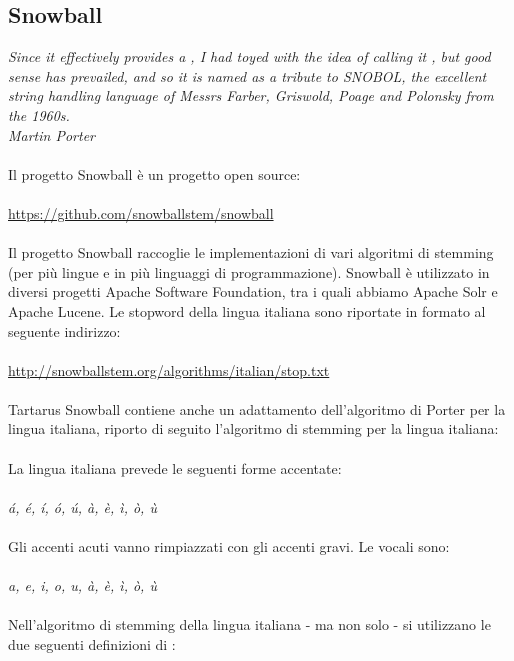 \documentclass{article}
\theoremstyle{plain}
\theoremstyle{definition}
\begin{document}
\subsection{Snowball}
\textit{
Since it effectively provides a , I had toyed with the idea of calling it , but good sense has prevailed, and so it is  named as a tribute to SNOBOL, the excellent string handling language of Messrs Farber, Griswold, Poage and Polonsky from the 1960s.
\\
Martin Porter
}
\\
\\
Il progetto Snowball è un progetto open source:
\\
\\
\url{https://github.com/snowballstem/snowball}
\\
\\
Il progetto Snowball raccoglie le implementazioni di vari algoritmi di stemming (per più lingue e in più linguaggi di programmazione). Snowball è utilizzato in diversi progetti Apache Software Foundation, tra i quali abbiamo Apache Solr e Apache Lucene. Le stopword della lingua italiana sono riportate in formato  al seguente indirizzo:
\\
\\
\url{http://snowballstem.org/algorithms/italian/stop.txt}
\\
\\
Tartarus Snowball contiene anche un adattamento dell'algoritmo di Porter per la lingua italiana, riporto di seguito l'algoritmo di stemming per la lingua italiana:
\\
\\
La lingua italiana prevede le seguenti forme accentate:
\\
\\
\textit{á, é, í, ó, ú, à, è, ì, ò, ù}
\\
\\
Gli accenti acuti vanno rimpiazzati con gli accenti gravi. Le vocali sono:
\\
\\
\textit{a, e, i, o, u, à, è, ì, ò, ù}
\\
\\
Nell'algoritmo di stemming della lingua italiana - ma non solo - si utilizzano le due seguenti definizioni di : 
\end{document}
